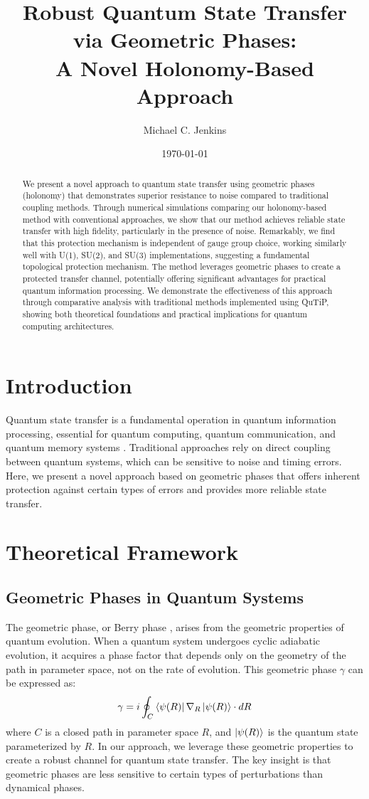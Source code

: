 \documentclass[12pt]{article}
\title{Robust Quantum State Transfer via Geometric Phases: \\
A Novel Holonomy-Based Approach}
\author{Michael C. Jenkins}
\date{\today}
\begin{document}
\maketitle

\begin{abstract}
We present a novel approach to quantum state transfer using geometric phases (holonomy) that demonstrates superior resistance to noise compared to traditional coupling methods. Through numerical simulations comparing our holonomy-based method with conventional approaches, we show that our method achieves reliable state transfer with high fidelity, particularly in the presence of noise. Remarkably, we find that this protection mechanism is independent of gauge group choice, working similarly well with U(1), SU(2), and SU(3) implementations, suggesting a fundamental topological protection mechanism. The method leverages geometric phases to create a protected transfer channel, potentially offering significant advantages for practical quantum information processing. We demonstrate the effectiveness of this approach through comparative analysis with traditional methods implemented using QuTiP, showing both theoretical foundations and practical implications for quantum computing architectures.
\end{abstract}

\section{Introduction}
Quantum state transfer is a fundamental operation in quantum information processing, essential for quantum computing, quantum communication, and quantum memory systems \cite{nielsen2002quantum}. Traditional approaches rely on direct coupling between quantum systems, which can be sensitive to noise and timing errors. Here, we present a novel approach based on geometric phases that offers inherent protection against certain types of errors and provides more reliable state transfer.

\section{Theoretical Framework}
\subsection{Geometric Phases in Quantum Systems}
The geometric phase, or Berry phase \cite{berry1984quantal}, arises from the geometric properties of quantum evolution. When a quantum system undergoes cyclic adiabatic evolution, it acquires a phase factor that depends only on the geometry of the path in parameter space, not on the rate of evolution. This geometric phase $\gamma$ can be expressed as:
\begin{equation}
\gamma = i \oint_C \bra{\psi(R)} \nabla_R \ket{\psi(R)} \cdot dR
\end{equation}
where $C$ is a closed path in parameter space $R$, and $\ket{\psi(R)}$ is the quantum state parameterized by $R$. In our approach, we leverage these geometric properties to create a robust channel for quantum state transfer. The key insight is that geometric phases are less sensitive to certain types of perturbations than dynamical phases.
\end{document}
